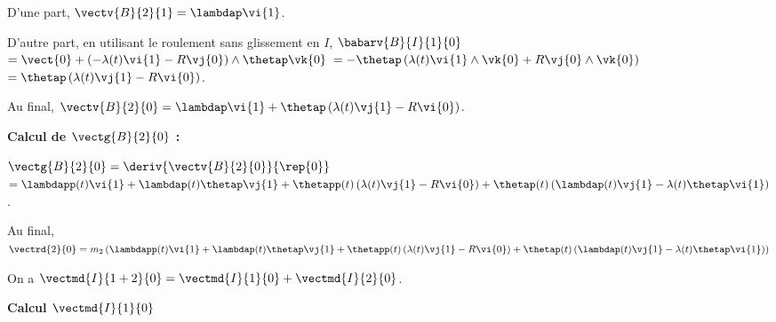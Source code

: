 D'une part,  $\vectv{B}{2}{1}=\lambdap\vi{1}$.

D'autre part, en utilisant le roulement sans glissement en $I$, 
$\babarv{B}{I}{1}{0} $ $=\vect{0}+\left(-\lambda(t)\vi{1}-R\vj{0} \right)\wedge\thetap \vk{0}$
$=-\thetap\left(\lambda(t)\vi{1}\wedge \vk{0}+R\vj{0}\wedge \vk{0} \right)$
$=\thetap\left(\lambda(t)\vj{1}-R\vi{0} \right)$.

Au final, $\vectv{B}{2}{0} = \lambdap\vi{1} + \thetap\left(\lambda(t)\vj{1}-R\vi{0} \right)$.

\vspace{.5cm}

\textbf{Calcul de $ \vectg{B}{2}{0}$ :}

$\vectg{B}{2}{0} = \deriv{\vectv{B}{2}{0}}{\rep{0}}$
$ = \lambdapp(t)\vi{1} +\lambdap(t)\thetap\vj{1} 
+ \thetapp(t)\left(\lambda(t)\vj{1}-R\vi{0} \right)
+ \thetap(t)\left(\lambdap(t)\vj{1}-\lambda(t)\thetap\vi{1} \right)
$.

Au final, $\vectrd{2}{0} =  m_2 \left( \lambdapp(t)\vi{1} +\lambdap(t)\thetap\vj{1} 
+ \thetapp(t)\left(\lambda(t)\vj{1}-R\vi{0} \right)
+ \thetap(t)\left(\lambdap(t)\vj{1}-\lambda(t)\thetap\vi{1} \right)\right)$
\else
\fi

\ifprof
On a $\vectmd{I}{1+2}{0} = \vectmd{I}{1}{0} + \vectmd{I}{2}{0}$.

\textbf{Calcul $\vectmd{I}{1}{0}$}

